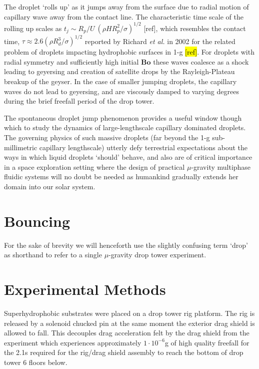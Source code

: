 \documentclass[a4paper, 12pt]{article}
\begin{document}
The droplet `rolls up' as it jumps away from the surface due to radial motion of capillary wave away from the contact line. The characteristic time scale of the rolling up scales as $t_j \sim R_p/U ~(\rho H R^2_p/\sigma)^{1/2}$ [ref], which resembles the contact time, $\tau \approx 2.6(\rho R^3_d/\sigma)^{1/2}$ reported by Richard \emph{et al.} in 2002 for the related problem of droplets impacting hydrophobic surfaces in 1-g \hl{[ref]}. For droplets with radial symmetry and sufficiently high initial $\mathbf{Bo}$ these waves coalesce as a shock leading to geyersing and creation of satellite drops by the Rayleigh-Plateau breakup of the geyser. In the case of smaller jumping droplets, the capillary waves do not lead to geyersing, and are viscously damped to varying degrees during the brief freefall period of the drop tower.

The spontaneous droplet jump phenomenon provides a useful window though which to study the dynamics of large-lengthscale capillary dominated droplets. The governing physics of such massive droplets (far beyond the 1-g sub-millimetric capillary lengthscale) utterly defy terrestrial expectations about the ways in which liquid droplets `should' behave, and also are of critical importance in a space exploration setting where the design of practical $\mu$-gravity  multiphase fluidic systems will no doubt be needed as humankind gradually extends her domain into our solar system.
\section{Bouncing}
For the sake of brevity we will henceforth use the slightly confusing term `drop' as shorthand to refer to a single $\mu$-gravity drop tower experiment.
\section{Experimental Methods}
Superhydrophobic substrates were placed on a drop tower rig platform. The rig is released by a solenoid chucked pin at the same moment the exterior drag shield is allowed to fall. This decouples drag acceleration felt by the drag shield from the experiment which experiences approximately $1 \cdot 10^{-6}$g of high quality freefall for the 2.1s required for the rig/drag shield assembly to reach the bottom of drop tower 6 floors below. 
\end{document}
